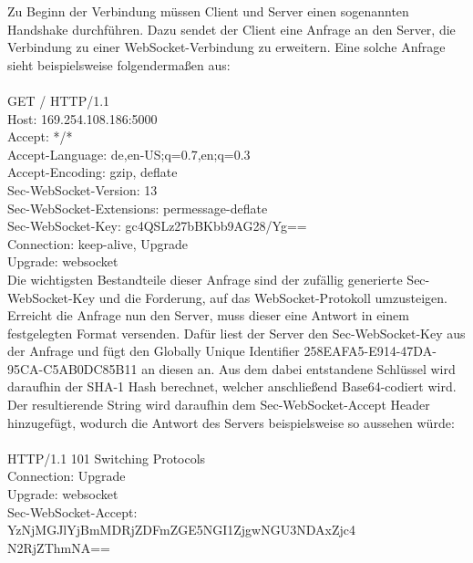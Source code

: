\documentclass[12pt, onecolumn, notitlepage]{scrartcl}
\begin{document}
Zu Beginn der Verbindung müssen Client und Server einen sogenannten Handshake durchführen. Dazu sendet der Client eine Anfrage an den Server, die Verbindung zu einer WebSocket-Verbindung zu erweitern. Eine solche Anfrage sieht beispielsweise folgendermaßen aus: \\ \\
GET / HTTP/1.1 \\
Host: 169.254.108.186:5000 \\
Accept: */* \\
Accept-Language: de,en-US;q=0.7,en;q=0.3 \\
Accept-Encoding: gzip, deflate \\
Sec-WebSocket-Version: 13 \\
Sec-WebSocket-Extensions: permessage-deflate \\
Sec-WebSocket-Key: gc4QSLz27bBKbb9AG28/Yg== \\
Connection: keep-alive, Upgrade \\
Upgrade: websocket \\

Die wichtigsten Bestandteile dieser Anfrage sind der zufällig generierte Sec-WebSocket-Key und die Forderung, auf das WebSocket-Protokoll umzusteigen. Erreicht die Anfrage nun den Server, muss dieser eine Antwort in einem festgelegten Format versenden. Dafür liest der Server den Sec-WebSocket-Key aus der Anfrage und fügt den Globally Unique Identifier 258EAFA5-E914-47DA-95CA-C5AB0DC85B11 an diesen an. Aus dem dabei entstandene Schlüssel wird daraufhin der SHA-1 Hash berechnet, welcher anschließend Base64-codiert wird.  Der resultierende String wird daraufhin dem Sec-WebSocket-Accept Header hinzugefügt, wodurch die Antwort des Servers beispielsweise so aussehen würde: \\ \\
HTTP/1.1 101 Switching Protocols \\
Connection: Upgrade \\
Upgrade: websocket \\
Sec-WebSocket-Accept: YzNjMGJlYjBmMDRjZDFmZGE5NGI1ZjgwNGU3NDAxZjc4\\N2RjZThmNA== \\
\end{document}
